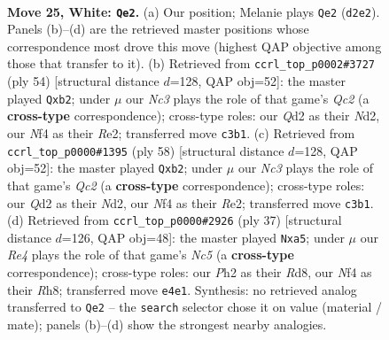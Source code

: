 \documentclass[11pt]{article}
\begin{document}
\clearpage

\begin{figure}[p]\centering
\begin{subfigure}{0.46\textwidth}\centering
\resizebox{\linewidth}{!}{%
\newchessgame
\chessboard[
  setfen={r2q3r/ppp1b1k1/5pp1/3P1b1p/Pnp1RN2/2N3P1/RPPQ1P1P/2B3K1 w - - 3 25},
  showmover=false,
  pgfstyle=straightmove, color=movearrow, markmove={d2-e2}
]}
\caption{}
\end{subfigure}\hfill
\begin{subfigure}{0.46\textwidth}\centering
\resizebox{\linewidth}{!}{%
\newchessgame
\chessboard[
  setfen={1q2r1k1/1b2rp1p/p2p2p1/n1P5/Pp2P1nP/1P1B1N2/1bQNRPP1/2R3K1 w - - 0 28},
  showmover=false,
  pgfstyle=straightmove, color=movearrow, markmove={c2-b2}
]}
\caption{}
\end{subfigure}
\\[4pt]
\begin{subfigure}{0.46\textwidth}\centering
\resizebox{\linewidth}{!}{%
\newchessgame
\chessboard[
  setfen={1q2r1k1/1b2rp1p/p2p2p1/n1P5/Pp2P1nP/1P1B1N2/1bQNRPP1/2R3K1 w - - 0 30},
  showmover=false,
  pgfstyle=straightmove, color=movearrow, markmove={c2-b2}
]}
\caption{}
\end{subfigure}\hfill
\begin{subfigure}{0.46\textwidth}\centering
\resizebox{\linewidth}{!}{%
\newchessgame
\chessboard[
  setfen={3rk2r/1pq1bp2/p2p1np1/P3p1Bp/2n5/1N1B1P2/1PP1Q1PP/1K1RR3 b k - 2 19},
  showmover=false,
  pgfstyle=straightmove, color=movearrow, markmove={c4-a5}
]}
\caption{}
\end{subfigure}
\caption{\textbf{Move 25, White: \texttt{Qe2}.} (a) Our position; Melanie plays \texttt{Qe2} (\texttt{d2e2}). Panels (b)--(d) are the retrieved master positions whose correspondence most drove this move (highest QAP objective among those that transfer to it). (b) Retrieved from \texttt{ccrl\_top\_p0002\#3727} (ply 54) [structural distance $d$=128, QAP obj=52]: the master played \texttt{Qxb2}; under $\mu$ our \emph{Nc3} plays the role of that game's \emph{Qc2} (a \textbf{cross-type} correspondence); cross-type roles: our \emph{Q}d2 as their \emph{N}d2, our \emph{N}f4 as their \emph{R}e2; transferred move \texttt{c3b1}. (c) Retrieved from \texttt{ccrl\_top\_p0000\#1395} (ply 58) [structural distance $d$=128, QAP obj=52]: the master played \texttt{Qxb2}; under $\mu$ our \emph{Nc3} plays the role of that game's \emph{Qc2} (a \textbf{cross-type} correspondence); cross-type roles: our \emph{Q}d2 as their \emph{N}d2, our \emph{N}f4 as their \emph{R}e2; transferred move \texttt{c3b1}. (d) Retrieved from \texttt{ccrl\_top\_p0000\#2926} (ply 37) [structural distance $d$=126, QAP obj=48]: the master played \texttt{Nxa5}; under $\mu$ our \emph{Re4} plays the role of that game's \emph{Nc5} (a \textbf{cross-type} correspondence); cross-type roles: our \emph{P}h2 as their \emph{R}d8, our \emph{N}f4 as their \emph{R}h8; transferred move \texttt{e4e1}. Synthesis: no retrieved analog transferred to \texttt{Qe2} -- the \texttt{search} selector chose it on value (material / mate); panels (b)--(d) show the strongest nearby analogies.}
\label{fig:thought-m48}
\end{figure}
\end{document}
